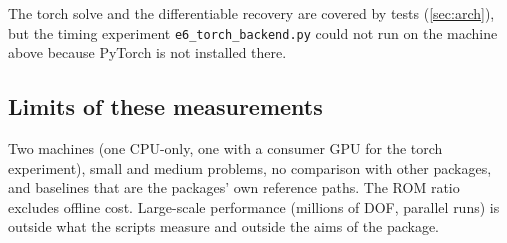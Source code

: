 \begin{table}[t]
\centering\footnotesize
\caption{Solve times in ms for the reduced system of a Quad4 plate: SciPy against torch (CG and dense) on each available device; ``--'' means not run.}\label{tab:torch}

\end{table}

\begin{table}[t]
\centering\footnotesize
\caption{Stress-recovery times in ms: batched NumPy against torch on each available device.}\label{tab:torchstress}

\end{table}
\else
The torch solve and the differentiable recovery are covered by tests (\cref{sec:arch}), but the timing experiment \texttt{e6\_torch\_backend.py} could not run on the machine above because PyTorch is not installed there. 
\fi

\subsection{Limits of these measurements}
Two machines (one CPU-only, one with a consumer GPU for the torch experiment), small and medium problems, no comparison with other packages, and baselines that are the packages' own reference paths. The ROM ratio excludes offline cost. Large-scale performance (millions of DOF, parallel runs) is outside what the scripts measure and outside the aims of the package.
